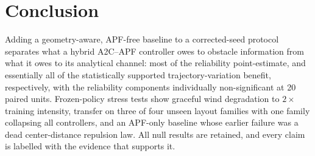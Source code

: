 \documentclass[conference]{IEEEtran}
\begin{document}
\section{Conclusion}
Adding a geometry-aware, APF-free baseline to a corrected-seed protocol separates what a hybrid A2C--APF
controller owes to obstacle information from what it owes to its analytical channel: most of the reliability
point-estimate, and essentially all of the statistically supported trajectory-variation benefit, respectively,
with the reliability components individually non-significant at 20 paired units. Frozen-policy stress tests show
graceful wind degradation to $2\times$ training intensity, transfer on three of four unseen layout families with
one family collapsing all controllers, and an APF-only baseline whose earlier failure was a dead center-distance
repulsion law. All null results are retained, and every claim is labelled with the evidence that supports it.



\end{document}
